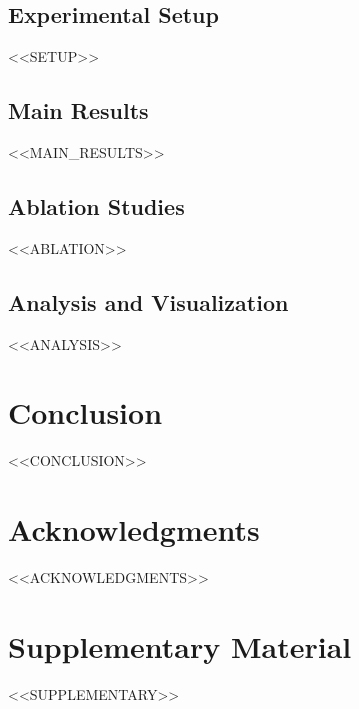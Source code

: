 \documentclass[10pt,twocolumn,letterpaper]{article}
\begin{document}
\subsection{Experimental Setup}
\label{sec:setup}
<<SETUP>>

\subsection{Main Results}
\label{sec:results}
<<MAIN_RESULTS>>

\subsection{Ablation Studies}
\label{sec:ablation}
<<ABLATION>>

\subsection{Analysis and Visualization}
\label{sec:analysis}
<<ANALYSIS>>

\section{Conclusion}
\label{sec:conclusion}
<<CONCLUSION>>

\section*{Acknowledgments}
<<ACKNOWLEDGMENTS>>

{\small


}

\clearpage
\appendix
\section{Supplementary Material}
<<SUPPLEMENTARY>>
\end{document}
